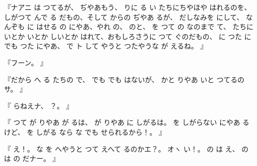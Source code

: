 『ナアニ
は
つてるが、
ぢやあもう、
りに
る
い
たちにちやほや
はれるのを、
しがつて
んで
る
だもの、そして
からの
ぢやあ
るが、
だしなみを
にして、
なんぞも
に
はせる
の
にやあ、やれ
の、
のと、
を
つて
の
なのまで
て、
たちに
いとか
いとか
しいとか
はれて、おもしろさうに
つて
ぐのだもの、
に
つた
にでも
つた
にやあ、
で
ト
して
やうと
つたやうな
が
えるね。
』

『フーン。
』

『だから
へ
る
たちの
で、
でも
でも
はないが、
かと
りやあ
いと
つてるのサ。
』

『
らねえナ、
？。
』

『
つて
が
りやあ
が
るは、
が
りやあ
に
しがるは。
を
しがらない
にやあ
るけど、
を
しがる
なら
な
でも
せられるから！。
』

『
え！。
な
を
へやうと
つて
えへて
るのかエ？。
オヽ
い！。
の
は
え、
の
は
の
だナー。
』

